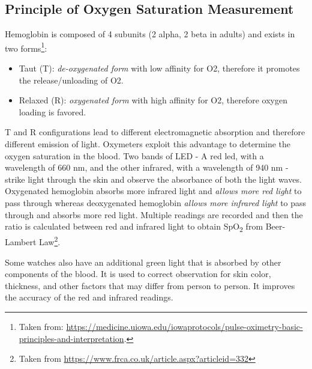 \documentclass[pdflatex,sn-mathphys]{sn-jnl}%
\theoremstyle{thmstyleone}%
\theoremstyle{thmstyletwo}%
\theoremstyle{thmstylethree}%
\begin{document}
\subsection{Principle of Oxygen Saturation Measurement}
Hemoglobin is composed of 4 subunits (2 alpha, 2 beta in adults) and exists in two forms\footnote{Taken from: \href{https://medicine.uiowa.edu/iowaprotocols/pulse-oximetry-basic-principles-and-interpretation}{https://medicine.uiowa.edu/iowaprotocols/pulse-oximetry-basic-principles-and-interpretation}.}: 
\begin{itemize}
    \item Taut (T): \textit{de-oxygenated form} with low affinity for O2, therefore it promotes the release/unloading of O2. 
    \item Relaxed (R): \textit{ oxygenated form} with high affinity for O2, therefore oxygen loading is favored. 
\end{itemize}
T and R configurations lead to different electromagnetic absorption and therefore different emission of light. Oxymeters exploit this advantage to determine the oxygen saturation in the blood. 
Two bands of LED - A red led, with a wavelength of 660 nm, and the other infrared, with a wavelength of 940 nm - strike light through the skin and observe the absorbance of both the light waves. Oxygenated hemoglobin absorbs more infrared light and \textit{allows more red light} to pass through whereas deoxygenated hemoglobin\textit{ allows more infrared light }to pass through and absorbs more red light.
Multiple readings are recorded and then the ratio is calculated between red and infrared light to obtain SpO\textsubscript{2} from Beer-Lambert Law\footnote{Taken from \href{https://www.frca.co.uk/article.aspx?articleid=332}{https://www.frca.co.uk/article.aspx?articleid=332}}.

Some watches also have an additional green light that is absorbed by other components of the blood. It is used to correct observation for skin color, thickness, and other factors that may differ from person to person. It improves the accuracy of the red and infrared readings.
\end{document}

